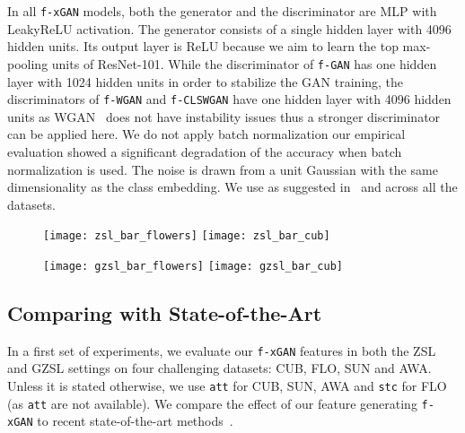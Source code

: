 \documentclass[10pt,twocolumn,letterpaper]{article}
\newcommand{\myparagraph}[1]{\vspace{6pt}\noindent{\bf #1}}
\def\mthd{\texttt{f-xGAN}\xspace}
\begin{document}
\myparagraph{Implementation details.} In all \mthd models, both the generator and the discriminator are MLP with LeakyReLU activation. The generator consists of a single hidden layer with 4096 hidden units. Its output layer is ReLU because we aim to learn the top max-pooling units of ResNet-101. While the discriminator of \texttt{f-GAN} has one hidden layer with 1024 hidden units in order to stabilize the GAN training, the discriminators of \texttt{f-WGAN} and \texttt{f-CLSWGAN} have one hidden layer with 4096 hidden units as WGAN~\cite{gulrajani2017improved} does not have instability issues thus a stronger discriminator can be applied here. We do not apply batch normalization our empirical evaluation showed a significant degradation of the accuracy when batch normalization is used. The noise  is drawn from a unit Gaussian with the same dimensionality as the class embedding. We use  as suggested in~\cite{gulrajani2017improved} and  across all the datasets. 


\begin{figure*}[t]
	\centering
    \begin{subfigure}[]{0.49\linewidth}
        \texttt{[image: zsl\_bar\_flowers]}
		\texttt{[image: zsl\_bar\_cub]}
        \label{fig:zsl_bar_zsl}
    \end{subfigure}
    \hfill
    \begin{subfigure}[]{0.49\linewidth}
            \texttt{[image: gzsl\_bar\_flowers]}
        \texttt{[image: gzsl\_bar\_cub]}
        \label{fig:zsl_bar_gzsl}
    \end{subfigure}
    \vspace{-3mm}
	\caption{Comparing \mthd versions with \texttt{f-GMMN} as well as comparing multimodal embedding methods with softmax.}
	\label{fig:zsl_bar}
\end{figure*}


\subsection{Comparing with State-of-the-Art}

In a first set of experiments, we evaluate our \mthd features in both the ZSL and GZSL settings on four challenging datasets: CUB, FLO, SUN and AWA.
Unless it is stated otherwise, we use \texttt{att} for CUB, SUN, AWA and \texttt{stc} for FLO (as \texttt{att} are not available).
We compare the effect of our feature generating \mthd to  recent state-of-the-art methods~\cite{XSA17}.
\end{document}
